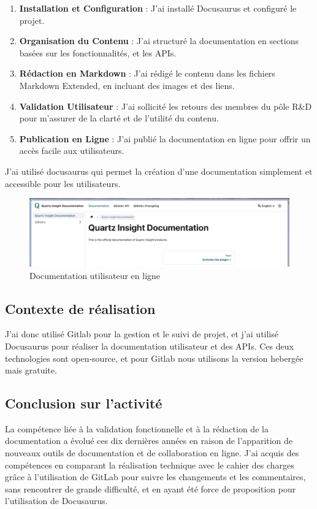 \documentclass[a4paper, 11pt]{report}
\begin{document}
\begin{enumerate}
\item
  \textbf{Installation et Configuration} : J'ai installé Docusaurus et
  configuré le projet.
\item
  \textbf{Organisation du Contenu} : J'ai structuré la documentation en
  sections basées sur les fonctionnalités, et les APIs.
\item
  \textbf{Rédaction en Markdown} : J'ai rédigé le contenu dans les fichiers
  Markdown Extended, en incluant des images et des liens.
\item
  \textbf{Validation Utilisateur} : J'ai sollicité les retours des
  membres du pôle R&D pour m'assurer de la clarté et de l'utilité du contenu.
\item
  \textbf{Publication en Ligne} : J'ai publié la documentation en ligne
  pour offrir un accès facile aux utilisateurs.
\end{enumerate}
J'ai utilisé docusaurus qui permet la création d'une documentation
simplement et accessible pour les utilisateurs.
  \begin{figure}[H]
      \centering
      \includegraphics[scale=0.30,center]{screenshots/documentation.png}
      \caption{Documentation utilisateur en ligne}
  \end{figure}
\subsection{Contexte de réalisation}
J'ai donc utilisé Gitlab pour la gestion et le suivi de projet, et j'ai utilisé
Docusaurus pour réaliser la documentation utilisateur et des APIs. Ces deux technologies
sont open-source, et pour Gitlab nous utilisons la version hebergée mais gratuite.
\subsection{Conclusion sur l'activité}
La compétence liée à la validation fonctionnelle et à la rédaction de la
documentation a évolué ces dix dernières années en raison de
l'apparition de nouveaux outils de documentation et de collaboration en
ligne.
\newline
\newline
J'ai acquis des compétences en comparant la réalisation technique avec
le cahier des charges grâce à l'utilisation de GitLab pour suivre les
changements et les commentaires, sans rencontrer de grande difficulté,
et en ayant été force de proposition pour l'utilisation de Docusaurus.
\end{document}
